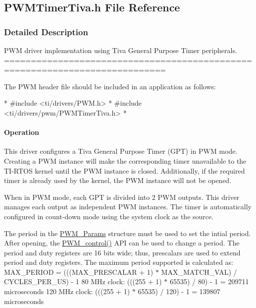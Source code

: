 \subsection{P\-W\-M\-Timer\-Tiva.\-h File Reference}
\label{_p_w_m_timer_tiva_8h}


\subsubsection{Detailed Description}
P\-W\-M driver implementation using Tiva General Purpose Timer peripherals. ============================================================================

The P\-W\-M header file should be included in an application as follows\-: 
\begin{DoxyCode}
*  #include <ti/drivers/PWM.h>
*  #include <ti/drivers/pwm/PWMTimerTiva.h>
*  
\end{DoxyCode}


\paragraph*{Operation}

This driver configures a Tiva General Purpose Timer (G\-P\-T) in P\-W\-M mode. Creating a P\-W\-M instance will make the corresponding timer unavailable to the T\-I-\/\-R\-T\-O\-S kernel until the P\-W\-M instance is closed. Additionally, if the required timer is already used by the kernel, the P\-W\-M instance will not be opened.

When in P\-W\-M mode, each G\-P\-T is divided into 2 P\-W\-M outputs. This driver manages each output as independent P\-W\-M instances. The timer is automatically configured in count-\/down mode using the system clock as the source.

The period in the \hyperlink{struct_p_w_m___params}{P\-W\-M\-\_\-\-Params} structure must be used to set the intial period. After opening, the \hyperlink{_p_w_m_8h_ade999f5b12997479efa1ac85aaf46ef5}{P\-W\-M\-\_\-control()} A\-P\-I can be used to change a period. The period and duty registers are 16 bits wide; thus, prescalars are used to extend period and duty registers. The maximum period supported is calculated as\-: M\-A\-X\-\_\-\-P\-E\-R\-I\-O\-D = (((M\-A\-X\-\_\-\-P\-R\-E\-S\-C\-A\-L\-A\-R + 1) $\ast$ M\-A\-X\-\_\-\-M\-A\-T\-C\-H\-\_\-\-V\-A\-L) / C\-Y\-C\-L\-E\-S\-\_\-\-P\-E\-R\-\_\-\-U\-S) -\/ 1 80 M\-Hz clock\-: (((255 + 1) $\ast$ 65535) / 80) -\/ 1 = 209711 microseconds 120 M\-Hz clock\-: (((255 + 1) $\ast$ 65535) / 120) -\/ 1 = 139807 microseconds

